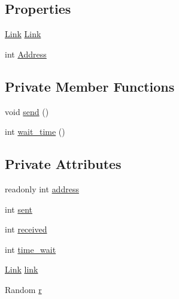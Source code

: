 \subsection*{Properties}
\begin{DoxyCompactItemize}
\item 
\hyperlink{classNetTrafficSimulator_1_1Link}{Link} \hyperlink{classNetTrafficSimulator_1_1EndNode_aaa7c476166fa515ebc9d16c6ccc83875}{Link}
\item 
int \hyperlink{classNetTrafficSimulator_1_1EndNode_ad810757c44c8e17c2147a2ae1598a840}{Address}
\end{DoxyCompactItemize}
\subsection*{Private Member Functions}
\begin{DoxyCompactItemize}
\item 
void \hyperlink{classNetTrafficSimulator_1_1EndNode_a021bef61770e7ec3561b24edca6526ba}{send} ()
\item 
int \hyperlink{classNetTrafficSimulator_1_1EndNode_a9287a628dea98e2611bde679eb3c63da}{wait\-\_\-time} ()
\end{DoxyCompactItemize}
\subsection*{Private Attributes}
\begin{DoxyCompactItemize}
\item 
readonly int \hyperlink{classNetTrafficSimulator_1_1EndNode_a84d0df6c9c755c895dffff6a531823d2}{address}
\item 
int \hyperlink{classNetTrafficSimulator_1_1EndNode_a45bd4418f00eb56fde0618470a05688e}{sent}
\item 
int \hyperlink{classNetTrafficSimulator_1_1EndNode_aec9de5a4499a35773abb2e5ebc6b153e}{received}
\item 
int \hyperlink{classNetTrafficSimulator_1_1EndNode_a92b73535be26c46a619a2c307ecd3ad4}{time\-\_\-wait}
\item 
\hyperlink{classNetTrafficSimulator_1_1Link}{Link} \hyperlink{classNetTrafficSimulator_1_1EndNode_a3fde207ff4a49bafd01df2e89fff7d11}{link}
\item 
Random \hyperlink{classNetTrafficSimulator_1_1EndNode_ab68702887e7cdb3933a3a006ea508a76}{r}
\end{DoxyCompactItemize}


